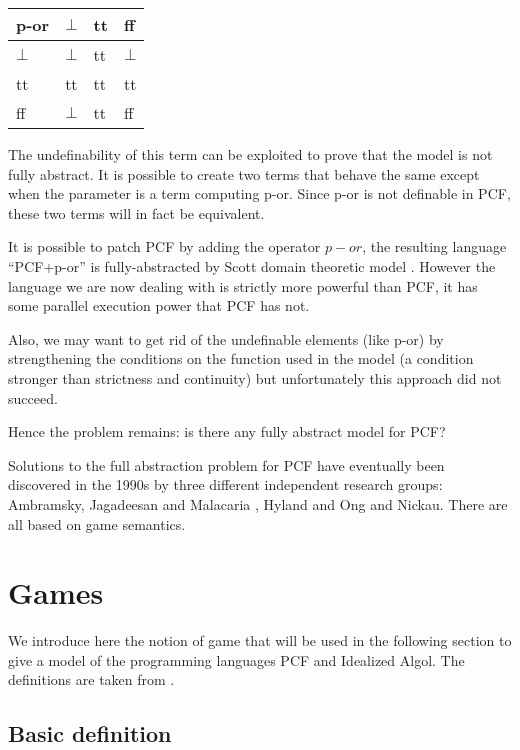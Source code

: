 \begin{center}
\begin{tabular}{l|lll}
p-or  & $\bot$ & tt & ff \\ \hline
$\bot$ & $\bot$ & tt & $\bot$\\
tt & tt & tt & tt\\
ff & $\bot$ & tt & ff\\
\end{tabular}
\end{center}

The undefinability of this term can be exploited to prove that the
model is not fully abstract. It is possible to create two terms that
behave the same except when the parameter is a term computing p-or.
Since p-or is not definable in PCF, these two terms will in fact be
equivalent.

It is possible to patch PCF by adding the operator $p-or$, the
resulting language ``PCF+p-or'' is fully-abstracted by Scott domain
theoretic model \citep{DBLP:journals/tcs/Plotkin77}. However the language we are now dealing with is
strictly more powerful than PCF, it has some parallel execution
power that PCF has not.

Also, we may want to get rid of the undefinable elements (like p-or)
by strengthening the conditions on the function used in the model (a
condition stronger than strictness and continuity) but unfortunately
this approach did not succeed.

Hence the problem remains: is there any fully abstract model for
PCF?

Solutions to the full abstraction problem for PCF have eventually
been discovered in the 1990s by three different independent research
groups: Ambramsky, Jagadeesan and Malacaria \citep{abramsky94full},
Hyland and Ong \citep{hylandong_pcf} and Nickau. There are all based
on game semantics.


\section{Games}

\label{sec:catgames}

We introduce here the notion of game that will be used in the following section to give a model of the programming languages
PCF and Idealized Algol. The definitions are taken from \cite{abramsky:game-semantics, hylandong_pcf, abramsky94full}.

\subsection{Basic definition}

